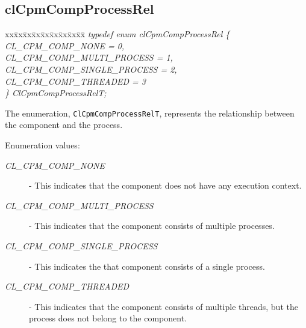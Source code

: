 {\subsection{clCpmCompProcessRel}
 \begin{tabbing}
 xx\=xx\=xx\=xx\=xx\=xx\=xx\=xx\=xx\=\kill
\textit{typedef enum clCpmCompProcessRel \{}\\
 \>\>\>\>\textit{CL\_CPM\_COMP\_NONE = 0,}\\
 \>\>\>\>\textit{CL\_CPM\_COMP\_MULTI\_PROCESS = 1,}\\
 \>\>\>\>\textit{CL\_CPM\_COMP\_SINGLE\_PROCESS = 2,}\\
 \>\>\>\>\textit{CL\_CPM\_COMP\_THREADED = 3}\\
 \textit{\} ClCpmCompProcessRelT;}\\
\end{tabbing}
The enumeration, {\tt{ClCpmCompProcessRelT}}, represents the relationship between the component and the process. 
\begin{Desc}
\item[Enumeration values: ]\par
\begin{description}
\item[{\em CL\_\-CPM\_\-COMP\_\-NONE}] - This indicates that the component does not have any execution context. 
\item[{\em CL\_\-CPM\_\-COMP\_\-MULTI\_\-PROCESS}] - This indicates that the component consists of multiple processes. 
\item[{\em CL\_\-CPM\_\-COMP\_\-SINGLE\_\-PROCESS}] - This indicates the that component consists of a single process. 
\item[{\em CL\_\-CPM\_\-COMP\_\-THREADED}] - This indicates that the component consists of multiple threads, but the process does not belong to the 
component. 
\end{description}
\end{Desc}

}
